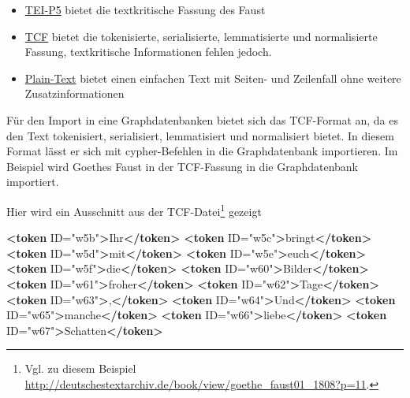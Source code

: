 \documentclass[ngerman,]{scrreprt}
\newenvironment{Shaded}{}{}
\newcommand{\KeywordTok}[1]{\textcolor[rgb]{0.00,0.44,0.13}{\textbf{#1}}}
\newcommand{\StringTok}[1]{\textcolor[rgb]{0.25,0.44,0.63}{#1}}
\newcommand{\OtherTok}[1]{\textcolor[rgb]{0.00,0.44,0.13}{#1}}
\newcommand{\NormalTok}[1]{#1}
\providecommand{\tightlist}{%
  \setlength{\itemsep}{0pt}\setlength{\parskip}{0pt}}
\begin{document}
\begin{itemize}
\tightlist
\item
  \href{http://deutschestextarchiv.de/book/download_xml/goethe_faust01_1808}{TEI-P5} bietet die textkritische Fassung des Faust
\item
  \href{http://deutschestextarchiv.de/book/download_fulltcf/16181}{TCF} bietet die tokenisierte, serialisierte, lemmatisierte und normalisierte Fassung, textkritische Informationen fehlen jedoch.
\item
  \href{http://deutschestextarchiv.de/book/download_txt/goethe_faust01_1808}{Plain-Text} bietet einen einfachen Text mit Seiten- und Zeilenfall ohne weitere Zusatzinformationen
\end{itemize}

Für den Import in eine Graphdatenbanken bietet sich das TCF-Format an, da es den Text tokenisiert, serialisiert, lemmatisiert und normalisiert bietet. In diesem Format lässt er sich mit cypher-Befehlen in die Graphdatenbank importieren. Im Beispiel wird Goethes Faust in der TCF-Fassung in die Graphdatenbank importiert.

Hier wird ein Ausschnitt aus der TCF-Datei\footnote{Vgl. zu diesem Beispiel \url{http://deutschestextarchiv.de/book/view/goethe_faust01_1808?p=11}.} gezeigt

\begin{Shaded}
\begin{Highlighting}[]
\KeywordTok{<token}\OtherTok{ ID=}\StringTok{"w5b"}\KeywordTok{>}\NormalTok{Ihr}\KeywordTok{</token>}
\KeywordTok{<token}\OtherTok{ ID=}\StringTok{"w5c"}\KeywordTok{>}\NormalTok{bringt}\KeywordTok{</token>}
\KeywordTok{<token}\OtherTok{ ID=}\StringTok{"w5d"}\KeywordTok{>}\NormalTok{mit}\KeywordTok{</token>}
\KeywordTok{<token}\OtherTok{ ID=}\StringTok{"w5e"}\KeywordTok{>}\NormalTok{euch}\KeywordTok{</token>}
\KeywordTok{<token}\OtherTok{ ID=}\StringTok{"w5f"}\KeywordTok{>}\NormalTok{die}\KeywordTok{</token>}
\KeywordTok{<token}\OtherTok{ ID=}\StringTok{"w60"}\KeywordTok{>}\NormalTok{Bilder}\KeywordTok{</token>}
\KeywordTok{<token}\OtherTok{ ID=}\StringTok{"w61"}\KeywordTok{>}\NormalTok{froher}\KeywordTok{</token>}
\KeywordTok{<token}\OtherTok{ ID=}\StringTok{"w62"}\KeywordTok{>}\NormalTok{Tage}\KeywordTok{</token>}
\KeywordTok{<token}\OtherTok{ ID=}\StringTok{"w63"}\KeywordTok{>}\NormalTok{,}\KeywordTok{</token>}
\KeywordTok{<token}\OtherTok{ ID=}\StringTok{"w64"}\KeywordTok{>}\NormalTok{Und}\KeywordTok{</token>}
\KeywordTok{<token}\OtherTok{ ID=}\StringTok{"w65"}\KeywordTok{>}\NormalTok{manche}\KeywordTok{</token>}
\KeywordTok{<token}\OtherTok{ ID=}\StringTok{"w66"}\KeywordTok{>}\NormalTok{liebe}\KeywordTok{</token>}
\KeywordTok{<token}\OtherTok{ ID=}\StringTok{"w67"}\KeywordTok{>}\NormalTok{Schatten}\KeywordTok{</token>}
\end{Highlighting}
\end{Shaded}
\end{document}
